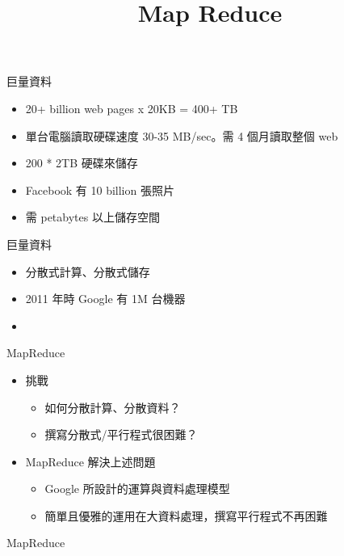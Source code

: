 \documentclass[12pt,c]{beamer}
\title{Map Reduce}
\begin{document}
\begin{frame}
  \titlepage
\end{frame}

\begin{frame}{巨量資料}
  \begin{itemize}
    \item 20+ billion web pages x 20KB = 400+ TB
    \item 單台電腦讀取硬碟速度 30-35 MB/sec。需 4 個月讀取整個 web
    \item 200 * 2TB 硬碟來儲存
    
  \end{itemize}
  \begin{itemize}
  \item Facebook 有 10 billion 張照片
  \item 需 petabytes 以上儲存空間
  \end{itemize}
\end{frame}

\begin{frame}{巨量資料}
  \begin{itemize}
    \item 分散式計算、分散式儲存 
    \item 2011 年時 Google 有 1M 台機器
      \item 
  \end{itemize}
\end{frame}

\begin{frame}{MapReduce}
\begin{itemize}
\item 挑戰
\begin{itemize}
\item 如何分散計算、分散資料？
\item 撰寫分散式/平行程式很困難？
\end{itemize}
\item MapReduce 解決上述問題
\begin{itemize}
  \item Google 所設計的運算與資料處理模型
  \item 簡單且優雅的運用在大資料處理，撰寫平行程式不再困難
\end{itemize}
\end{itemize}
  


\end{frame}

\begin{frame}{MapReduce}
\end{frame}
\end{document}
